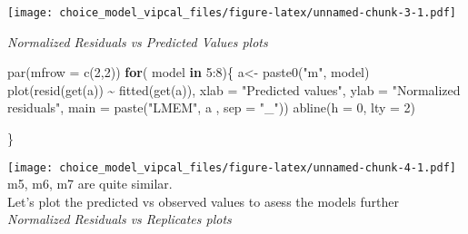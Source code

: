 \documentclass[
]{article}
\newenvironment{Shaded}{\begin{snugshade}}{\end{snugshade}}
\newcommand{\AttributeTok}[1]{\textcolor[rgb]{0.77,0.63,0.00}{#1}}
\newcommand{\ControlFlowTok}[1]{\textcolor[rgb]{0.13,0.29,0.53}{\textbf{#1}}}
\newcommand{\DecValTok}[1]{\textcolor[rgb]{0.00,0.00,0.81}{#1}}
\newcommand{\FunctionTok}[1]{\textcolor[rgb]{0.00,0.00,0.00}{#1}}
\newcommand{\NormalTok}[1]{#1}
\newcommand{\OtherTok}[1]{\textcolor[rgb]{0.56,0.35,0.01}{#1}}
\newcommand{\SpecialCharTok}[1]{\textcolor[rgb]{0.00,0.00,0.00}{#1}}
\newcommand{\StringTok}[1]{\textcolor[rgb]{0.31,0.60,0.02}{#1}}
\begin{document}
\texttt{[image: choice\_model\_vipcal\_files/figure-latex/unnamed-chunk-3-1.pdf]}

\emph{Normalized Residuals vs Predicted Values plots}

\begin{Shaded}
\begin{Highlighting}[]
\FunctionTok{par}\NormalTok{(}\AttributeTok{mfrow =} \FunctionTok{c}\NormalTok{(}\DecValTok{2}\NormalTok{,}\DecValTok{2}\NormalTok{))}
\ControlFlowTok{for}\NormalTok{( model }\ControlFlowTok{in} \DecValTok{5}\SpecialCharTok{:}\DecValTok{8}\NormalTok{)\{}
\NormalTok{  a}\OtherTok{\textless{}{-}} \FunctionTok{paste0}\NormalTok{(}\StringTok{"m"}\NormalTok{, model)}
   \FunctionTok{plot}\NormalTok{(}\FunctionTok{resid}\NormalTok{(}\FunctionTok{get}\NormalTok{(a)) }\SpecialCharTok{\textasciitilde{}} \FunctionTok{fitted}\NormalTok{(}\FunctionTok{get}\NormalTok{(a)), }
        \AttributeTok{xlab =} \StringTok{"Predicted values"}\NormalTok{, }
        \AttributeTok{ylab =} \StringTok{"Normalized residuals"}\NormalTok{, }
        \AttributeTok{main =} \FunctionTok{paste}\NormalTok{(}\StringTok{"LMEM"}\NormalTok{, a , }\AttributeTok{sep =} \StringTok{"\_"}\NormalTok{))}
   \FunctionTok{abline}\NormalTok{(}\AttributeTok{h =} \DecValTok{0}\NormalTok{, }\AttributeTok{lty =} \DecValTok{2}\NormalTok{)}
  
\NormalTok{\}}
\end{Highlighting}
\end{Shaded}

\texttt{[image: choice\_model\_vipcal\_files/figure-latex/unnamed-chunk-4-1.pdf]}
m5, m6, m7 are quite similar.\\

Let's plot the predicted vs observed values to asess the models
further\\

\emph{Normalized Residuals vs Replicates plots}
\end{document}
